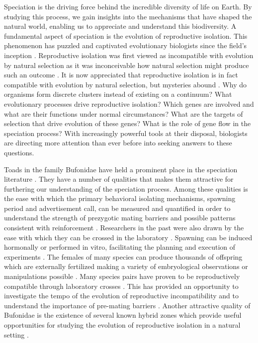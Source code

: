 
Speciation is the driving force behind the incredible diversity of life on Earth. 
By studying this process, we gain insights into the mechanisms that 
have shaped the natural world, enabling us to appreciate and understand this 
biodiversity.
A fundamental aspect of speciation is the evolution of reproductive isolation.
This phenomenon has puzzled and captivated evolutionary biologists since the 
field's inception \parencite{mallet2008}.
Reproductive isolation was first viewed as incompatible with evolution by  
natural selection as it was inconceivable how natural selection might produce 
such an outcome \parencite{mallet2008}.
It is now appreciated that reproductive isolation is in fact compatible with 
evolution by natural selection, but mysteries abound \parencite{coyne2004}.
Why do organisms form discrete clusters instead of existing on a continuum?
What evolutionary processes drive reproductive isolation?
Which genes are involved and what are their functions under normal circumstances?
What are the targets of selection that drive evolution of these genes? 
What is the role of gene flow in the speciation process?
With increasingly powerful tools at their disposal, biologists are directing  
more attention than ever before into seeking answers to these questions.

Toads in the family Bufonidae have held a prominent place in the speciation 
literature \parencite{blair1972}.
They have a number of qualities that makes them attractive for furthering our
understanding of the speciation process. 
Among these qualities is the ease with which the primary behavioral isolating mechanisms, 
spawning period and advertisement call, can be measured and quantified in order 
to understand the strength of prezygotic mating barriers and possible patterns 
consistent with reinforcement \parencite{cocroft1995,blair1974,kennedy1962}.
Researchers in the past were also drawn by the ease with which they can be 
crossed in the laboratory \parencite{blair1972}.
Spawning can be induced hormonally or performed in vitro, facilitating the planning  
and execution of experiments \parencite{trudeau2010}.
The females of many species can produce thousands of offspring which are externally 
fertilized making a variety of embryological observations or manipulations possible \parencite{blair1972}.
Many species pairs have proven to be reproductively compatible through laboratory crosses \parencite{blair1972}. 
This has provided an opportunity to investigate the tempo of the evolution of 
reproductive incompatibility and to understand the importance of pre-mating 
barriers \parencite{sasa1998,malone2008,fontenot2011}.
Another attractive quality of Bufonidae is the existence of several known 
hybrid zones which provide useful opportunities for studying the evolution 
of reproductive isolation in a natural setting \parencite{green1996,vanriemsdijk2023}. 

